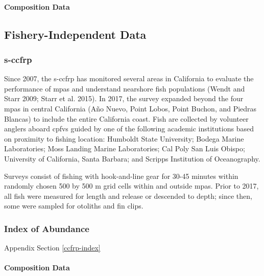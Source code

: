 \documentclass[11pt,
  english,
  letterpaper,
]{article}
\begin{document}
\hypertarget{composition-data-1}{%
\paragraph{Composition Data}\label{composition-data-1}}

\hypertarget{fishery-independent-data}{%
\subsection{Fishery-Independent Data}\label{fishery-independent-data}}

\hypertarget{section}{%
\subsubsection{\texorpdfstring{\acrlong{s-ccfrp}}{}}\label{section}}

Since 2007, the \gls{s-ccfrp} has monitored several areas in California to evaluate the performance of \glspl{mpa} and understand nearshore fish populations (Wendt and Starr 2009; Starr et al. 2015). In 2017, the survey expanded beyond the four \Gls{mpa}s in central California (Año Nuevo, Point Lobos, Point Buchon, and Piedras Blancas) to include the entire California coast. Fish are collected by volunteer anglers aboard \glspl{cpfv} guided by one of the following academic institutions based on proximity to fishing location: Humboldt State University; Bodega Marine Laboratories; Moss Landing Marine Laboratories; Cal Poly San Luis Obispo; University of California, Santa Barbara; and Scripps Institution of Oceanography.

Surveys consist of fishing with hook-and-line gear for 30-45 minutes within randomly chosen 500 by 500 m grid cells within and outside \glspl{mpa}. Prior to 2017, all fish were measured for length and release or descended to depth; since then, some were sampled for otoliths and fin clips.

\hypertarget{index-of-abundance}{%
\subsubsection{Index of Abundance}\label{index-of-abundance}}

Appendix Section \ref{ccfrp-index}

\hypertarget{composition-data-2}{%
\paragraph{Composition Data}\label{composition-data-2}}
\end{document}
